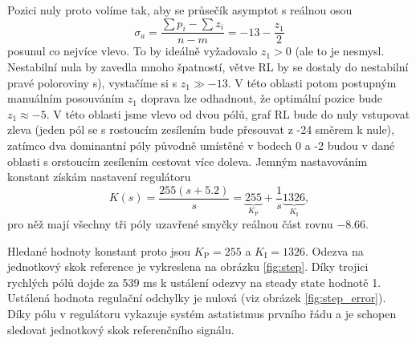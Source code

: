 \documentclass[twoside]{article}
\begin{document}
Pozici nuly proto volíme tak, aby se průsečík asymptot s reálnou osou
\begin{equation}
	\sigma_a = \frac{\sum p_i - \sum z_i}{n - m} = -13 -\frac{z_1}{2}
\end{equation}
posunul co nejvíce vlevo. To by ideálně vyžadovalo $z_1 > 0$ (ale to je nesmysl. Nestabilní nula by zavedla mnoho špatností, větve RL by se dostaly do nestabilní pravé poloroviny s),
vystačíme si s $z_1 \gg -13$. V této oblasti potom postupným manuálním posouváním $z_1$ doprava lze odhadnout, že optimální pozice bude $z_1 \approx -5$.
V této oblasti jsme vlevo od dvou pólů, graf RL bude do nuly vstupovat zleva (jeden pól se s rostoucím zesílením bude přesouvat z -24 směrem k nule),
zatímco dva dominantní póly původně umístěné v bodech 0 a -2 budou v dané oblasti s orstoucím zesílením cestovat více doleva.
Jemným nastavováním konstant získám nastavení regulátoru
\begin{equation}
	K(s) = \frac{255(s+5.2)}{s} = \underbrace{255}_{K_\text{P}} + \frac{1}{s} \underbrace{1326}_{K_\text{I}},
\end{equation}
pro něž mají všechny tři póly uzavřené smyčky reálnou část rovnu $-8.66$.

Hledané hodnoty konstant proto jsou $K_\text{P} = 255$ a $K_\text{I} = 1326$. Odezva na jednotkový skok reference je vykreslena na obrázku \ref{fig:step}.
Díky trojici rychlých pólů dojde za 539 ms k ustálení odezvy na steady state hodnotě 1. Ustálená hodnota regulační odchylky je nulová (viz obrázek \ref{fig:step_error}). 
Díky pólu v regulátoru vykazuje systém astatistmus prvního řádu a je schopen sledovat jednotkový skok referenčního signálu.
\end{document}
